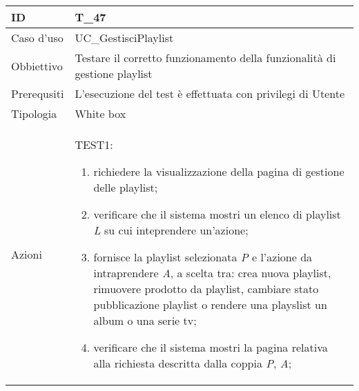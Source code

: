 \begin{table}[hb]
    \centering
    \begin{tabular}{ |p{2cm}|p{10cm}|  }
        \hline
        ID          & T\_47                                                                              \\\hline
        Caso d'uso  & UC\_GestisciPlaylist                                                           \\\hline
        Obbiettivo  & Testare il corretto funzionamento della funzionalità di gestione playlist \\\hline
        Prerequsiti & L'esecuzione del test è effettuata con privilegi di Utente                         \\\hline
        Tipologia   & White box                                                                          \\\hline
        Azioni      &
        TEST1:
        \begin{enumerate}[nosep, topsep=0pt]
            \item richiedere la visualizzazione della pagina di gestione delle playlist;
            \item verificare che il sistema mostri un elenco di playlist \emph{L} su cui inteprendere un'azione;
            \item fornisce la playlist selezionata \emph{P} e l'azione da intraprendere \emph{A}, a scelta tra: crea nuova playlist, rimuovere prodotto da playlist, cambiare stato pubblicazione playlist o rendere una playslist un album o una serie tv;
            \item verificare che il sistema mostri la pagina relativa alla richiesta descritta dalla coppia \emph{P}, \emph{A};
        \end{enumerate}
        \\\hline
    \end{tabular}
\end{table}

